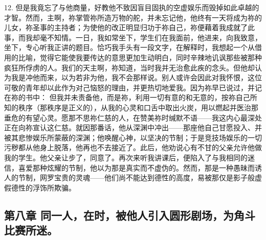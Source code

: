 12. 但是我竟忘了与他商量，好教他不致因盲目固执的空虚娱乐而毁掉如此卓越的才智。然而，主啊，祢掌管祢所造万物的舵，并未忘记他，他终有一天将成为祢的儿女，祢圣事的主持者；为使他的改正明显归功于祢自己，祢便藉着我成就了此事，而我却毫不知情。一日，我如常坐下，学生们在我面前，他进来，向我致意，坐下，专心听我正讲的题目。恰巧我手头有一段文字，在解释时，我想起一个从借用的比喻，觉得它能使我要传达的意思更加生动明白，同时辛辣地讥讽那些被那种疯狂所俘虏的人。我们的天主啊，祢知道，当时我并无治愈此疾的念头。但他却认为我是冲他而来，以为若非为他，我不会那样说。别人或许会因此对我怀恨，这位可敬的青年却以此作为对己恼怒的理由，并更热切地爱我。因为祢早已说过，并记在祢的书中： 但我并未责备他，而是祢，利用一切有意的和无意的，按祢自己所知的秩序（那秩序是正义的），从我的心灵和口舌中取出火炭，用以燃起并医治那垂危的有望心灵。愿那不思祢仁慈的人，在赞美祢时缄默不语——我这内心最深处正在向祢宣认这仁慈。就因那番话，他从深渊中冲出——那座他自己甘愿投入、并被其悲惨娱乐所蒙蔽的深渊；他唤醒心神，以坚决的节制；于是竞技场娱乐的一切污秽都从他身上脱落，他再也不去接近了。此后，他劝说心有不甘的父亲允许他做我的学生。他父亲让步了，同意了。再次来听我讲课后，便陷入了与我相同的迷信，喜爱那种炫耀的节制，他以为那是真实而不虚伪的。然而，那是一种愚昧而诱人的节制，网罗宝贵的灵魂——他们尚不能达到德性的高度，易被那仅是影子般虚假德性的浮饰所欺骗。\par


\subsection{第八章 同一人，在时，被他人引入圆形剧场，为角斗比赛所迷。}

